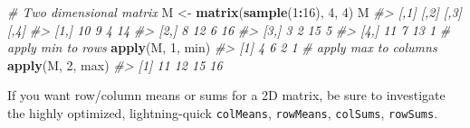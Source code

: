 \documentclass[]{book}
\newenvironment{Shaded}{\begin{snugshade}}{\end{snugshade}}
\newcommand{\KeywordTok}[1]{\textcolor[rgb]{0.13,0.29,0.53}{\textbf{#1}}}
\newcommand{\DecValTok}[1]{\textcolor[rgb]{0.00,0.00,0.81}{#1}}
\newcommand{\StringTok}[1]{\textcolor[rgb]{0.31,0.60,0.02}{#1}}
\newcommand{\CommentTok}[1]{\textcolor[rgb]{0.56,0.35,0.01}{\textit{#1}}}
\newcommand{\OperatorTok}[1]{\textcolor[rgb]{0.81,0.36,0.00}{\textbf{#1}}}
\newcommand{\NormalTok}[1]{#1}
\theoremstyle{definition}
\theoremstyle{definition}
\theoremstyle{definition}
\theoremstyle{remark}
\begin{document}
\begin{Shaded}
\begin{Highlighting}[]
\CommentTok{# Two dimensional matrix}
\NormalTok{M <-}\StringTok{ }\KeywordTok{matrix}\NormalTok{(}\KeywordTok{sample}\NormalTok{(}\DecValTok{1}\OperatorTok{:}\DecValTok{16}\NormalTok{), }\DecValTok{4}\NormalTok{, }\DecValTok{4}\NormalTok{)}
\NormalTok{M}
\CommentTok{#>      [,1] [,2] [,3] [,4]}
\CommentTok{#> [1,]   10    9    4   14}
\CommentTok{#> [2,]    8   12    6   16}
\CommentTok{#> [3,]    3    2   15    5}
\CommentTok{#> [4,]   11    7   13    1}
\CommentTok{# apply min to rows}
\KeywordTok{apply}\NormalTok{(M, }\DecValTok{1}\NormalTok{, min)}
\CommentTok{#> [1] 4 6 2 1}
\CommentTok{# apply max to columns}
\KeywordTok{apply}\NormalTok{(M, }\DecValTok{2}\NormalTok{, max)}
\CommentTok{#> [1] 11 12 15 16}
\end{Highlighting}
\end{Shaded}

If you want row/column means or sums for a 2D matrix, be sure to
investigate the highly optimized, lightning-quick \texttt{colMeans},
\texttt{rowMeans}, \texttt{colSums}, \texttt{rowSums}.
\end{document}
